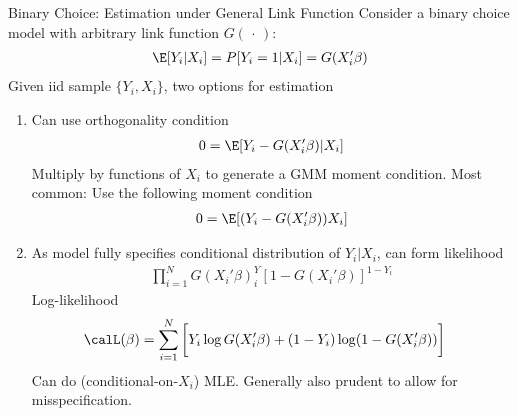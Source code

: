 \documentclass[aspectratio=169, handout]{beamer}
\begin{document}
{\scriptsize
\begin{frame}{Binary Choice: Estimation under General Link Function}
Consider a binary choice model with arbitrary link function
$G(\,\cdot\,)$:
\begin{align*}
  \E[Y_i|X_i]
  =
  P[Y_i=1|X_i]
  =
  G(X_i'\beta)
\end{align*}
Given iid sample $\{Y_i,X_i\}$, two options for estimation
\begin{enumerate}
  \item
    Can use orthogonality condition
    \vspace{-5pt}
    \begin{align*}
      0 = \E[Y_i-G(X_i'\beta)|X_i]
    \end{align*}
    Multiply by functions of $X_i$ to generate a GMM moment condition.
    Most common: Use the following moment condition
    \vspace{-5pt}
    \begin{align*}
      0 = \E[(Y_i-G(X_i'\beta))X_i]
    \end{align*}

  \item
    As model \alert{fully} specifies conditional distribution of
    $Y_i|X_i$, can form likelihood
    \vspace{-5pt}
    \begin{align*}
      \prod_{i=1}^N
      G(X_i'\beta)^Y_i
      [1-G(X_i'\beta)]^{1-Y_i}
    \end{align*}
    Log-likelihood
    \vspace{-5pt}
    \begin{align*}
      \calL(\beta)
      &=
      \sum_{i=1}^N
      \bigg[
      Y_i
      \log
      G(X_i'\beta)
      +
      (1-Y_i)
      \log
      (1-G(X_i'\beta))
      \bigg]
    \end{align*}
    Can do (conditional-on-$X_i$) MLE.
    Generally also prudent to allow for misspecification.

\end{enumerate}
\end{frame}
}
\end{document}
